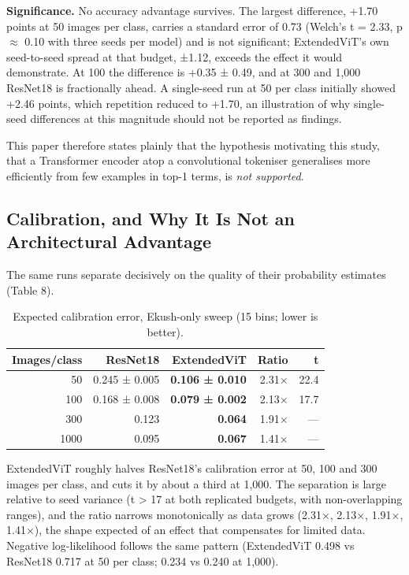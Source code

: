 \textbf{Significance.} No accuracy advantage survives. The largest difference, +1.70
points at 50 images per class, carries a standard error of 0.73 (Welch's t = 2.33, p \ensuremath{\approx} 0.10 with three seeds per model) and is not significant; ExtendedViT's own
seed-to-seed spread at that budget, ±1.12, exceeds the effect it would
demonstrate. At 100 the difference is +0.35 ± 0.49, and at 300 and 1,000
ResNet18 is fractionally ahead. A single-seed run at 50 per class
initially showed +2.46 points, which repetition reduced to +1.70, an
illustration of why single-seed differences at this magnitude should not
be reported as findings.

This paper therefore states plainly that the hypothesis motivating this study,
that a Transformer encoder atop a convolutional tokeniser generalises
more efficiently from few examples in top-1 terms, is \emph{not
supported}.

\hypertarget{calibration-and-why-it-is-not-an-architectural-advantage}{%
\subsection{Calibration, and Why It Is Not an Architectural
Advantage}\label{calibration-and-why-it-is-not-an-architectural-advantage}}

The same runs separate decisively on the quality of their probability
estimates (Table 8).

\begin{table}[htbp]
\centering
\footnotesize
\caption{Expected calibration error, Ekush-only sweep (15 bins;
lower is better).}
\begin{tabular}{rrrrr}
\toprule
Images/class & ResNet18 & Extended\-Vi\-T & Ratio & t \\
\midrule
50 & 0.245 ± 0.005 & \textbf{0.106 ± 0.010} & 2.31× & 22.4 \\
100 & 0.168 ± 0.008 & \textbf{0.079 ± 0.002} & 2.13× & 17.7 \\
300 & 0.123 & \textbf{0.064} & 1.91× & --- \\
1000 & 0.095 & \textbf{0.067} & 1.41× & --- \\
\bottomrule
\end{tabular}
\end{table}


ExtendedViT roughly halves ResNet18's calibration error at 50, 100 and 300
images per class, and cuts it by about a third at 1,000. The separation is large relative to seed variance (t
\textgreater{} 17 at both replicated budgets, with non-overlapping
ranges), and the ratio narrows monotonically as data grows (2.31×,
2.13×, 1.91×, 1.41×), the shape expected of an effect that compensates
for limited data. Negative log-likelihood follows the same pattern
(ExtendedViT 0.498 vs ResNet18 0.717 at 50 per class; 0.234 vs 0.240 at 1,000).

